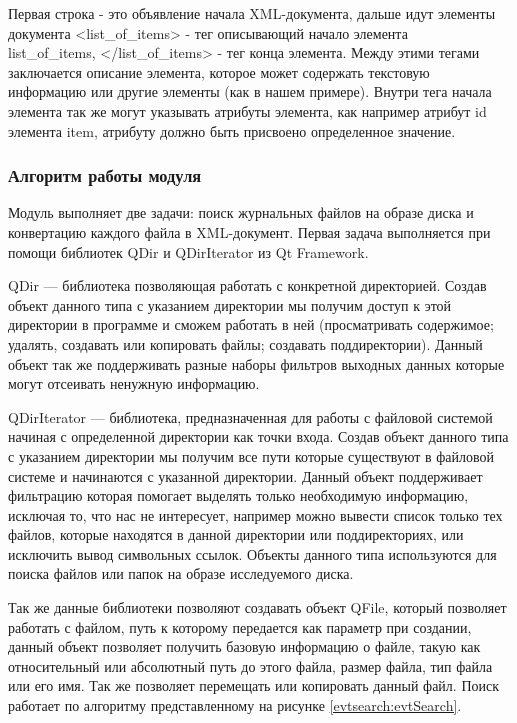 Первая строка - это объявление начала XML-документа, дальше идут элементы документа <list\_of\_items> - тег описывающий начало элемента \\list\_of\_items, </list\_of\_items> - тег конца элемента. Между этими тегами заключается описание элемента, которое может содержать текстовую информацию или другие элементы (как в нашем примере). Внутри тега начала элемента так же могут указывать атрибуты элемента, как например атрибут id элемента item, атрибуту должно быть присвоено определенное значение.

\subsubsection{Алгоритм работы модуля}

Модуль выполняет две задачи: поиск журнальных файлов на образе диска и конвертацию каждого файла в XML-документ. Первая задача выполняется при помощи библиотек QDir и QDirIterator из Qt Framework.

QDir — библиотека позволяющая работать с конкретной директорией. Создав объект данного типа с указанием директории мы получим доступ к этой директории в программе и сможем работать в ней (просматривать содержимое; удалять, создавать или копировать файлы; создавать поддиректории). Данный объект так же поддерживать разные наборы фильтров выходных данных которые могут отсеивать ненужную информацию.

QDirIterator — библиотека, предназначенная для работы с файловой системой начиная с определенной директории как точки входа. Создав объект данного типа с указанием директории мы получим все пути которые существуют в файловой системе и начинаются с указанной директории. Данный объект поддерживает фильтрацию которая помогает выделять только необходимую информацию, исключая то, что нас не интересует, например можно вывести список только тех файлов, которые находятся в данной директории или поддиректориях, или исключить вывод символьных ссылок. Объекты данного типа используются для поиска файлов или папок на образе исследуемого диска.

Так же данные библиотеки позволяют создавать объект QFile, который позволяет работать с файлом, путь к которому передается как параметр при создании, данный объект позволяет получить базовую информацию о файле, такую как относительный или абсолютный путь до этого файла, размер файла, тип файла или его имя. Так же позволяет перемещать или копировать данный файл. Поиск работает по алгоритму представленному на рисунке \ref{evtsearch:evtSearch}.

